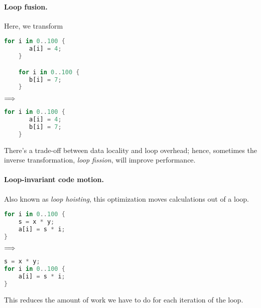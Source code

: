 \paragraph{Loop fusion.} Here, we transform
\begin{center}
\vspace*{-1em}
\begin{minipage}{.3\textwidth}
  \begin{lstlisting}[language=Rust]
    for i in 0..100 {
       a[i] = 4;
    }

    for i in 0..100 {
       b[i] = 7;
    }
  \end{lstlisting}
  \end{minipage} $\Longrightarrow \hspace*{2em}$ \begin{minipage}{.4\textwidth}
  \begin{lstlisting}[language=Rust]
    for i in 0..100 {
       a[i] = 4;
       b[i] = 7;
    }
  \end{lstlisting}
  \end{minipage}
  \end{center}
There's a trade-off between data locality and loop overhead; hence,
sometimes the inverse transformation, \emph{loop fission}, will
improve performance.

\paragraph{Loop-invariant code motion.} Also known as \emph{loop hoisting},
this optimization moves calculations out of a loop. 
\begin{center}
\vspace*{-1em}
\begin{minipage}{.3\textwidth}
  \begin{lstlisting}[language=Rust]
for i in 0..100 {
    s = x * y;
    a[i] = s * i;
}
  \end{lstlisting}
  \end{minipage} $\Longrightarrow \hspace*{2em}$ \begin{minipage}{.4\textwidth}
  \begin{lstlisting}[language=Rust]
s = x * y;
for i in 0..100 {
    a[i] = s * i;
}
  \end{lstlisting}
  \end{minipage}
  \end{center}

This reduces the amount of work we have to do for each iteration of the loop.


